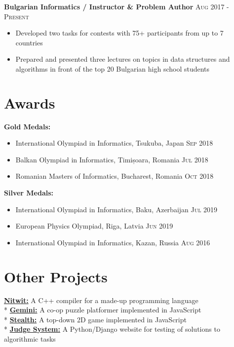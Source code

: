 \documentclass[letterpaper,11pt]{article}
\newcommand{\noskip}{\vspace{-\parskip}}
\newcommand{\doskip}{\vspace{\parskip}}
\begin{document}
\textbf{Bulgarian Informatics / Instructor \& Problem Author}
\hfill
\textsc{Aug 2017 - Present}
\noskip
\begin{itemize}
    \item Developed two tasks for contests with 75+ participants from up to 7
        countries
    \item Prepared and presented three lectures on topics in data structures and
        algorithms in front of the top 20 Bulgarian high school students
\end{itemize}

\section*{Awards}
\textbf{Gold Medals:}
\noskip
\begin{itemize}
    \item International Olympiad in Informatics, Tsukuba, Japan
        \hfill \textsc{Sep 2018}
    \item Balkan Olympiad in Informatics, Timișoara, Romania
        \hfill \textsc{Jul 2018}
    \item Romanian Masters of Informatics, Bucharest, Romania
        \hfill \textsc{Oct 2018}
\end{itemize}

\textbf{Silver Medals:}
\noskip
\begin{itemize}
    \item International Olympiad in Informatics, Baku, Azerbaijan
        \hfill \textsc{Jul 2019}
    \item European Physics Olympiad, Riga, Latvia
        \hfill \textsc{Jun 2019}
    \item International Olympiad in Informatics, Kazan, Russia
        \hfill \textsc{Aug 2016}
\end{itemize}

\section*{Other Projects}
\href{https://github.com/Alaxe/nitwit}{\textbf{Nitwit:}}
A C++ compiler for a made-up programming language\\*
\href{https://github.com/Alaxe/gemini}{\textbf{Gemini:}}
A co-op puzzle platformer implemented in JavaScript\\*
\href{https://github.com/Alaxe/stealth}{\textbf{Stealth:}}
A top-down 2D game implemented in JavaScript\\*
\href{https://github.com/Alaxe/judgeSystem}{\textbf{Judge System:}}
A Python/Django website for testing of solutions to algorithmic tasks
\end{document}
